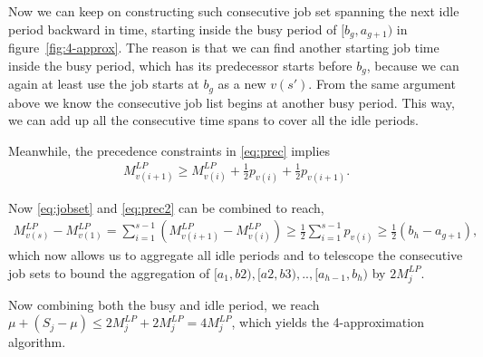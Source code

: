 Now we can keep on constructing such consecutive job set spanning the next idle period backward in time, starting inside the busy period of $[b_g, a_{g+1})$ in figure~\ref{fig:4-approx}. The reason is that we can find another starting job time inside the busy period, which has its predecessor starts before $b_g$, because we can again at least use the job starts at $b_g$ as a new $v(s')$. From the same argument above we know the consecutive job list begins at another busy period. This way, we can add up all the consecutive time spans to cover all the idle periods. 

Meanwhile, the precedence constraints in \eqref{eq:prec} implies
\begin{align}
M^{LP}_{v(i+1)} \geq M^{LP}_{v(i)} + \frac{1}{2}p_{v(i)} + \frac{1}{2}p_{v(i+1)}. \label{eq:prec2}
\end{align}

Now \eqref{eq:jobset} and \eqref{eq:prec2} can be combined to reach,
\begin{align}
M^{LP}_{v(s)} - M^{LP}_{v(1)} = \sum_{i=1}^{s-1} \left(M^{LP}_{v(i+1)} - M^{LP}_{v(i)}\right) \geq \frac{1}{2}\sum_{i=1}^{s-1} p_{v(i)} \geq \frac{1}{2} (b_h-a_{g+1}),
\end{align}
which now allows us to aggregate all idle periods and to telescope the consecutive job sets to bound the aggregation of $[a_1, b2), [a2, b3), .., [a_{h-1}, b_h)$ by $2M_j^{LP}$. 

Now combining both the busy and idle period, we reach $\mu + (S_j - \mu) \leq 2M_j^{LP} + 2M_j^{LP} = 4M_j^{LP}$, which yields the 4-approximation algorithm.
